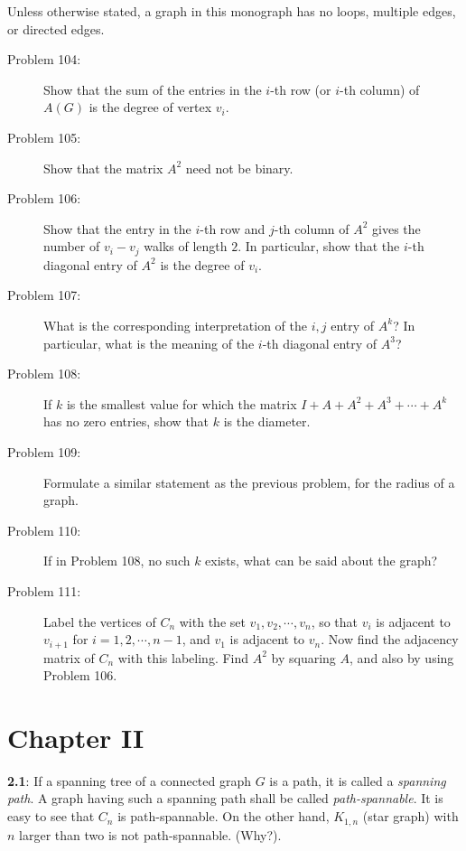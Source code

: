 \documentclass{article}
\begin{document}
Unless otherwise stated, a graph in this monograph has no loops, multiple edges, or directed edges.

\begin{description}

\item[Problem 104:] Show that the sum of the entries in the $i$-th row (or $i$-th column) of $A(G)$ is the degree of vertex $v_i$.

\item[Problem 105:] Show that the matrix $A^2$ need not be binary.

\item[Problem 106:] Show that the entry in the $i$-th row and $j$-th column of $A^2$ gives the number of $v_i-v_j$ walks of length $2$. In particular, show that the $i$-th diagonal entry of $A^2$ is the degree of $v_i$.

\item[Problem 107:] What is the corresponding interpretation of the $i,j$ entry of $A^k$? In particular, what is the meaning of the $i$-th diagonal entry of $A^3$?

\item[Problem 108:] If $k$ is the smallest value for which the matrix $I+A+A^2+A^3+\cdots+A^k$ has no zero entries, show that $k$ is the diameter.

\item[Problem 109:] Formulate a similar statement as the previous problem, for the radius of a graph.

\item[Problem 110:] If in Problem 108, no such $k$ exists, what can be said about the graph?

\item[Problem 111:] Label the vertices of $C_n$ with the set $v_1,v_2,\cdots,v_n$, so that $v_i$ is adjacent to $v_{i+1}$ for $i=1,2,\cdots,n-1$, and $v_1$ is adjacent to $v_n$. Now find the adjacency matrix of $C_n$ with this labeling. Find $A^2$ by squaring $A$, and also by using Problem 106.


\end{description}


\newpage


\section*{Chapter II}

\textbf{2.1}: If a spanning tree of a connected graph $G$ is a path, it is called a \emph{spanning path}. A graph having such a spanning path shall be called \emph{path-spannable}. It is easy to see that $C_n$ is path-spannable. On the other hand, $K_{1,n}$ (star graph) with $n$ larger than two is not path-spannable. (Why?).
\end{document}
